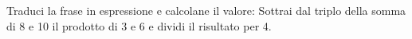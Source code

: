 \item Traduci la frase in espressione e calcolane il valore: Sottrai dal triplo della somma di 8 e 10 il prodotto di 3 e 6 e dividi il risultato per 4.